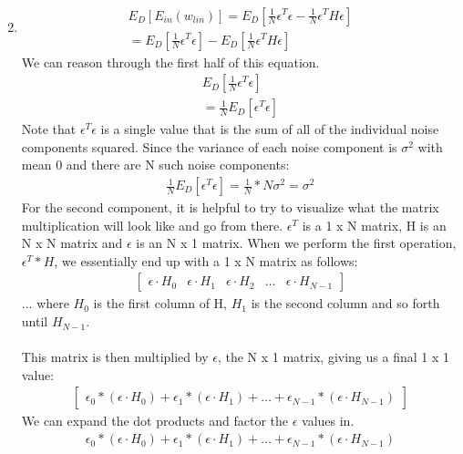 \documentclass[12pt]{article}
\begin{document}
\begin{enumerate}[label=(\alph*)]
\begin{gather*}
	\end{gather*}
	\item
	\begin{gather*}
		E_D[E_{in}(w_{lin})] = E_D[\frac{1}{N}\epsilon^T\epsilon - \frac{1}{N}\epsilon^TH\epsilon]
		\\ = E_D[\frac{1}{N}\epsilon^T\epsilon] - E_D[\frac{1}{N}\epsilon^TH\epsilon]
	\end{gather*}
	We can reason through the first half of this equation.
	\begin{gather*}
		E_D[\frac{1}{N}\epsilon^T\epsilon] 
		\\ = \frac{1}{N}E_D[\epsilon^T\epsilon]
	\end{gather*}
	Note that $\epsilon^T\epsilon$ is a single value that is the sum of all of the individual noise components squared. Since the variance of each noise component is $\sigma^2$ with mean $0$ and there are N such noise components:
	\begin{gather*}
		\frac{1}{N}E_D[\epsilon^T\epsilon] = \frac{1}{N} * N\sigma^2 = \sigma^2
	\end{gather*}
	For the second component, it is helpful to try to visualize what the matrix multiplication will look like and go from there. $\epsilon^T$ is a 1 x N matrix, H is an N x N matrix and $\epsilon$ is an N x 1 matrix. When we perform the first operation, $\epsilon^T * H$, we essentially end up with a 1 x N matrix as follows:
	\begin{gather*}
	\begin{bmatrix}
		\epsilon \cdot H_0 & \epsilon \cdot H_1 & \epsilon \cdot H_2 & \dots & \epsilon \cdot H_{N-1}
	\end{bmatrix}
	\end{gather*}
	... where $H_0$ is the first column of H, $H_1$ is the second column and so forth until $H_{N-1}$.
	\\ \\ This matrix is then multiplied by $\epsilon$, the N x 1 matrix, giving us a final 1 x 1 value:
	\begin{gather*}
	\begin{bmatrix}
	\epsilon_0 * (\epsilon \cdot H_0) + \epsilon_1 * (\epsilon \cdot H_1) + \dots + \epsilon_{N-1} * (\epsilon \cdot H_{N-1})
	\end{bmatrix}	
	\end{gather*}
	We can expand the dot products and factor the $\epsilon$ values in.
	\begin{gather*}
	\epsilon_0 * (\epsilon \cdot H_0) + \epsilon_1 * (\epsilon \cdot H_1) + \dots + \epsilon_{N-1} * (\epsilon \cdot H_{N-1})

\end{gather*}
\end{enumerate}
\end{document}
